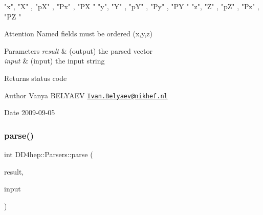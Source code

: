 \begin{DoxyCode}
\textcolor{stringliteral}{"x"}, \textcolor{stringliteral}{"X"} , \textcolor{stringliteral}{"pX"} , \textcolor{stringliteral}{"Px"} , \textcolor{stringliteral}{"PX "}
\textcolor{stringliteral}{"y"}, \textcolor{stringliteral}{"Y"} , \textcolor{stringliteral}{"pY"} , \textcolor{stringliteral}{"Py"} , \textcolor{stringliteral}{"PY "}
\textcolor{stringliteral}{"z"}, \textcolor{stringliteral}{"Z"} , \textcolor{stringliteral}{"pZ"} , \textcolor{stringliteral}{"Pz"} , \textcolor{stringliteral}{"PZ "}
\end{DoxyCode}


\begin{DoxyAttention}{Attention}
Named fields must be ordered {\ttfamily (x,y,z)}
\end{DoxyAttention}

\begin{DoxyParams}{Parameters}
{\em result} & (output) the parsed vector \\
\hline
{\em input} & (input) the input string \\
\hline
\end{DoxyParams}
\begin{DoxyReturn}{Returns}
status code 
\end{DoxyReturn}
\begin{DoxyAuthor}{Author}
Vanya B\+E\+L\+Y\+A\+EV \href{mailto:Ivan.Belyaev@nikhef.nl}{\tt Ivan.\+Belyaev@nikhef.\+nl} 
\end{DoxyAuthor}
\begin{DoxyDate}{Date}
2009-\/09-\/05 
\end{DoxyDate}
\hypertarget{namespace_d_d4hep_1_1_parsers_aa49d5f1a00fb97ffdcac92a067fc14a2}{}\label{namespace_d_d4hep_1_1_parsers_aa49d5f1a00fb97ffdcac92a067fc14a2} 
\subsubsection{\texorpdfstring{parse()}{parse()}\hspace{0.1cm}{\footnotesize\ttfamily [21/21]}}
{\footnotesize\ttfamily int D\+D4hep\+::\+Parsers\+::parse (\begin{DoxyParamCaption}\item[{R\+O\+O\+T\+::\+Math\+::\+Px\+Py\+Pz\+E\+Vector \&}]{result,  }\item[{const std\+::string \&}]{input }\end{DoxyParamCaption})}



